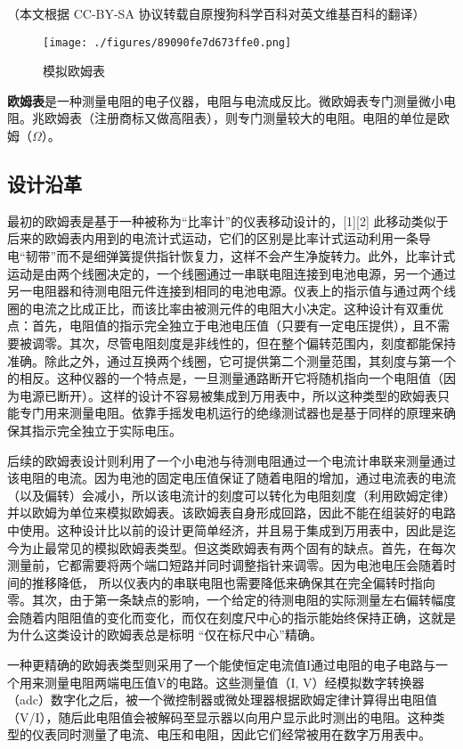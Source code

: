 
（本文根据 CC-BY-SA 协议转载自原搜狗科学百科对英文维基百科的翻译）

\begin{figure}[ht]
\centering
\texttt{[image: ./figures/89090fe7d673ffe0.png]}
\caption{模拟欧姆表} \label{fig_OMB_1}
\end{figure}
\textbf{欧姆表}是一种测量电阻的电子仪器，电阻与电流成反比。微欧姆表专门测量微小电阻。兆欧姆表（注册商标又做高阻表），则专门测量较大的电阻。电阻的单位是欧姆（$\Omega
$）。

\subsection{设计沿革}
最初的欧姆表是基于一种被称为“比率计”的仪表移动设计的，[1][2] 此移动类似于后来的欧姆表内用到的电流计式运动，它们的区别是比率计式运动利用一条导电“韧带”而不是细弹簧提供指针恢复力，这样不会产生净旋转力。此外，比率计式运动是由两个线圈决定的，一个线圈通过一串联电阻连接到电池电源，另一个通过另一电阻器和待测电阻元件连接到相同的电池电源。仪表上的指示值与通过两个线圈的电流之比成正比，而该比率由被测元件的电阻大小决定。这种设计有双重优点：首先，电阻值的指示完全独立于电池电压值（只要有一定电压提供），且不需要被调零。其次，尽管电阻刻度是非线性的，但在整个偏转范围内，刻度都能保持准确。除此之外，通过互换两个线圈，它可提供第二个测量范围，其刻度与第一个的相反。这种仪器的一个特点是，一旦测量通路断开它将随机指向一个电阻值（因为电源已断开）。这样的设计不容易被集成到万用表中，所以这种类型的欧姆表只能专门用来测量电阻。依靠手摇发电机运行的绝缘测试器也是基于同样的原理来确保其指示完全独立于实际电压。

后续的欧姆表设计则利用了一个小电池与待测电阻通过一个电流计串联来测量通过该电阻的电流。因为电池的固定电压值保证了随着电阻的增加，通过电流表的电流（以及偏转）会减小，所以该电流计的刻度可以转化为电阻刻度（利用欧姆定律）并以欧姆为单位来模拟欧姆表。该欧姆表自身形成回路，因此不能在组装好的电路中使用。这种设计比以前的设计更简单经济，并且易于集成到万用表中，因此是迄今为止最常见的模拟欧姆表类型。但这类欧姆表有两个固有的缺点。首先，在每次测量前，它都需要将两个端口短路并同时调整指针来调零。因为电池电压会随着时间的推移降低， 所以仪表内的串联电阻也需要降低来确保其在完全偏转时指向零。其次，由于第一条缺点的影响，一个给定的待测电阻的实际测量左右偏转幅度会随着内阻阻值的变化而变化，而仅在刻度尺中心的指示能始终保持正确，这就是为什么这类设计的欧姆表总是标明 “仅在标尺中心”精确。

一种更精确的欧姆表类型则采用了一个能使恒定电流值I通过电阻的电子电路与一个用来测量电阻两端电压值V的电路。这些测量值（I, V）经模拟数字转换器（adc）数字化之后，被一个微控制器或微处理器根据欧姆定律计算得出电阻值（V/I），随后此电阻值会被解码至显示器以向用户显示此时测出的电阻。这种类型的仪表同时测量了电流、电压和电阻，因此它们经常被用在数字万用表中。

